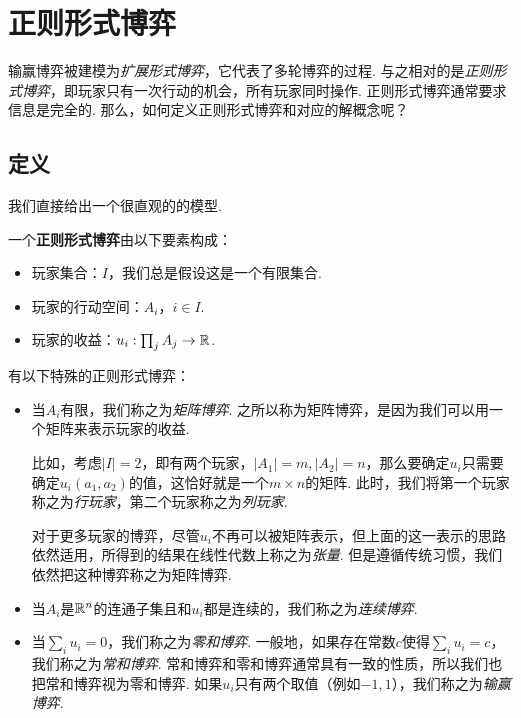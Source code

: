 \section{正则形式博弈}
输赢博弈被建模为\textit{扩展形式博弈}，它代表了多轮博弈的过程. 与之相对的是\textit{正则形式博弈}，即玩家只有一次行动的机会，所有玩家同时操作. 正则形式博弈通常要求信息是完全的. 那么，如何定义正则形式博弈和对应的解概念呢？

\subsection{定义}

我们直接给出一个很直观的的模型. 

\begin{definition}[正则形式博弈]
一个\textbf{正则形式博弈}由以下要素构成：
\begin{itemize}
    \item 玩家集合：$I$，我们总是假设这是一个有限集合.
    \item 玩家的行动空间：$A_i$，$i\in I$.
    \item 玩家的收益：$u_i:\prod_j A_j\to\mathbb{R}$.
\end{itemize}
\end{definition}

有以下特殊的正则形式博弈：
\begin{itemize}
    \item 当$A_i$有限，我们称之为\textit{矩阵博弈}. 之所以称为矩阵博弈，是因为我们可以用一个矩阵来表示玩家的收益. 
    
    比如，考虑$|I|=2$，即有两个玩家，$|A_1|=m,|A_2|=n$，那么要确定$u_i$只需要确定$u_i(a_1,a_2)$的值，这恰好就是一个$m\times n$的矩阵. 此时，我们将第一个玩家称之为\textit{行玩家}，第二个玩家称之为\textit{列玩家}.

    对于更多玩家的博弈，尽管$u_i$不再可以被矩阵表示，但上面的这一表示的思路依然适用，所得到的结果在线性代数上称之为\textit{张量}. 但是遵循传统习惯，我们依然把这种博弈称之为矩阵博弈.

    \item 当$A_i$是$\mathbb{R}^n$的连通子集且和$u_i$都是连续的，我们称之为\textit{连续博弈}.
    \item 当$\sum_i u_i=0$，我们称之为\textit{零和博弈}. 一般地，如果存在常数$c$使得$\sum_i u_i=c$，我们称之为\textit{常和博弈}. 常和博弈和零和博弈通常具有一致的性质，所以我们也把常和博弈视为零和博弈. 如果$u_i$只有两个取值（例如$-1,1$），我们称之为\textit{输赢博弈}.
\end{itemize}

